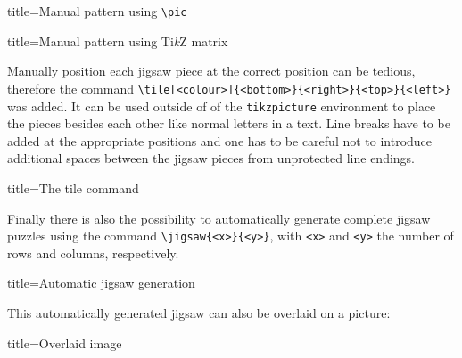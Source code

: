 \documentclass[parskip=half]{scrartcl}
\begin{document}
\begin{tcblisting}{title={Manual pattern using \texttt{\textbackslash pic}}}
\end{tcblisting}

\begin{tcblisting}{title={Manual pattern using Ti\emph{k}Z matrix}}
\end{tcblisting}

Manually position each jigsaw piece at the correct position can be tedious, therefore the command \lstinline|\tile[<colour>]{<bottom>}{<right>}{<top>}{<left>}| was added. It can be used outside of of the \lstinline|tikzpicture| environment to place the pieces besides each other like normal letters in a text. Line breaks have to be added at the appropriate positions and one has to be careful not to introduce additional spaces between the jigsaw pieces from unprotected line endings.

\begin{tcblisting}{title={The tile command}}
%
%

%
%

%
%
\end{tcblisting}

Finally there is also the possibility to automatically generate complete jigsaw puzzles using the command \lstinline|\jigsaw{<x>}{<y>}|, with \lstinline|<x>| and \lstinline|<y>| the number of rows and columns, respectively.

\begin{tcblisting}{title={Automatic jigsaw generation}}
\end{tcblisting}

This automatically generated jigsaw can also be overlaid on a picture:

\begin{tcblisting}{title={Overlaid image}}
\end{tcblisting}
\end{document}
